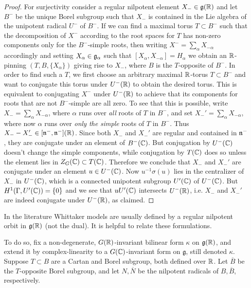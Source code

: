 \documentclass{article}
\theoremstyle{definition}
\numberwithin{equation}{section}
\renewcommand{\-}{\hyp{}}
\newcommand{\g}{\mathfrak g}
\begin{document}
\begin{proof}
For surjectivity consider a regular nilpotent element
$X_- \in \mathfrak{g}(\mathbb{R})$ and let $B^-$ be the unique Borel subgroup such
that $X_-$ is contained in the Lie algebra of the unipotent radical
$U^-$ of $B^-$. If we can find a maximal torus $T \subset B^-$ such
that the decomposition of $X^-$ according to the root spaces for $T$
has non-zero components only for the $B^-$-simple roots, then writing
$X^-=\sum_\alpha X_{-\alpha}$ accordingly and setting
$X_\alpha \in \mathfrak{g}_\alpha$ such that
$[X_\alpha,X_{-\alpha}]=H_\alpha$ we obtain an $\mathbb{R}$-pinning
$(T,B,\{X_\alpha\})$ giving rise to $X_-$, where $B$ is the
$T$-opposite of $B^-$. In order to find such a $T$, we first choose an
arbitrary maximal $\mathbb{R}$-torus $T \subset B^-$ and want to conjugate
this torus under $U^-(\mathbb{R})$ to obtain the desired torus. This is
equivalent to conjugating $X^-$ under $U^-(\mathbb{R})$ to achieve that its
components for roots that are not $B^-$-simple are all zero. To see
that this is possible, write $X_-=\sum_\alpha X_{-\alpha}$, where
$\alpha$ runs over \emph{all} roots of $T$ in $B^-$, and set
$X_-'=\sum_\alpha X_{-\alpha}$, where now $\alpha$ runs over
\emph{only the simple} roots of $T$ in $B^-$. Thus
$X_--X_-' \in [\mathfrak{n}^-,\mathfrak{n}^-](\mathbb{R})$. Since both $X_-$ and $X_-'$
are regular and contained in $\mathfrak{n}^-$, they are conjugate under an
element of $B^-(\mathbb{C})$. But conjugation by $U^-(\mathbb{C})$ doesn't change the
simple components, while conjugation by $T(\mathbb{C})$ does so unless the
element lies in $Z_G(\mathbb{C}) \subset T(\mathbb{C})$. Therefore we conclude that
$X_-$ and $X_-'$ are conjugate under an element $u \in U^-(\mathbb{C})$. Now
$u^{-1}\sigma(u)$ lies in the centralizer of $X_-$ in $U^-(\mathbb{C})$, which
is a connected unipotent subgroup $U'(\mathbb{C})$ of $U^-(\mathbb{C})$. But
$H^1(\Gamma,U'(\mathbb{C}))=\{0\}$ and we see that $uU'(\mathbb{C})$ intersects
$U^-(\mathbb{R})$, i.e. $X_-$ and $X_-'$ are indeed conjugate under $U^-(\mathbb{R})$,
as claimed.
\end{proof}



In the literature Whittaker models are usually defined by a regular
nilpotent orbit in $\g(\R)$ (not the dual). It is helpful to relate
these formulations.

To do so, fix a non-degenerate, $G(\mathbb{R})$-invariant bilinear form $\kappa$ on $\g(\R)$, and extend it by complex-linearity to 
a $G(\mathbb{C})$-invariant form on $\g$, still denoted $\kappa$. Suppose $T\subset B$ are a Cartan and Borel subgroup, both defined over $\mathbb{R}$. 
Let $\overline B$ be the $T$-opposite Borel subgroup, and let $N,\overline N$ be the nilpotent radicals of $B,\overline B$, respectively.
\end{document}
